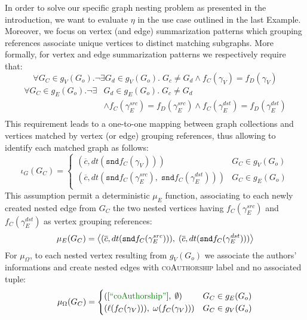 In order to solve our specific graph nesting problem as presented in the introduction, we want to evaluate $\eta$ in the use case outlined in the last Example.
Moreover, we focus on vertex (and edge) summarization patterns which grouping references associate unique vertices to distinct matching subgraphs. More formally, for vertex and edge summarization patterns we respectively require that:
\[\forall G_C\in g_V(G_o).\neg\exists G_d\in g_V(G_o).\; G_c\neq G_d\wedge f_C(\gamma_V)=f_D(\gamma_V)\]
\[\begin{split}
\forall G_C\in g_E(G_o).\neg\exists &G_d\in g_E(G_o).\; G_c\neq G_d\\
 &\wedge f_C(\gamma_E^{src})=f_D(\gamma_E^{src})\wedge f_C(\gamma_E^{dst})=f_D(\gamma_E^{dst})\\
\end{split}\]
This requirement leads to a one-to-one mapping between graph collections and vertices matched by vertex (or edge) grouping references, thus allowing to identify each matched graph as follows:
	\[\iota_G(G_C)=\begin{cases}
(\overline{c},dt(\texttt{snd}f_C(\gamma_V))) & G_C \in g_V(G_{o})\\
(\overline{c},dt\left(\texttt{snd}f_C(\gamma_E^{src}),\;\texttt{snd}f_C(\gamma_E^{dst})\right)) & G_C \in g_E(G_{o})\\
\end{cases}\]
This assumption permit a deterministic $\mu_E$ function, associating to each newly created nested edge from $G_C$ the two nested vertices having $f_C(\gamma_E^{src})$ and $f_C(\gamma_E^{dst})$ as vertex grouping references:
	\[\mu_E(G_C)=\Braket{(\overline{c},dt(\texttt{snd}f_C(\gamma_E^{src}))),\;(\overline{c},dt(\texttt{snd}f_C(\gamma_E^{dst})))}\]
For $\mu_\Omega$, to each nested vertex resulting from $g_{V}(G_{o})$  we associate  the authors' informations and create nested edges with \textsc{coAuthorship} label and no associated tuple:
	\[\mu_\Omega(G_C)=\begin{cases}
	([\mstr{coAuthorship}],\;\emptyset) & G_C \in g_E(G_{o})\\
	(\ell(f_C(\gamma_V))),\;\omega(f_C(\gamma_V))) & G_C \in g_V(G_{o})\\
	\end{cases}\]


